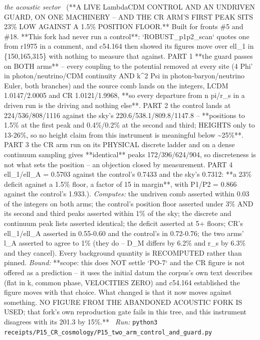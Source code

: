\begin{description}
\textit{the acoustic sector} \ (**A LIVE LambdaCDM CONTROL AND AN UNDRIVEN GUARD, ON ONE MACHINERY -- AND THE CR ARM'S FIRST PEAK SITS 23\% LOW AGAINST A 1.5\% POSITION FLOOR.** Built for fronts \#5 and \#18. **This fork had never run a control**: `ROBUST\_p1p2\_scan` quotes one from r1975 in a comment, and c54.164 then showed its figures move over ell\_1 in \{150,165,315\} with nothing to measure that against. PART 1 **the guard passes on BOTH arms** -- every coupling to the potential removed at every site (4 Phi' in photon/neutrino/CDM continuity AND k\textasciicircum{}2 Psi in photon-baryon/neutrino Euler, both branches) and the source comb lands on the integers, LCDM 1.0147/2.0005 and CR 1.0121/1.9968, **so every departure from n pi/r\_s in a driven run is the driving and nothing else**. PART 2 the control lands at 224/536/808/1116 against the sky's 220.6/538.1/809.8/1147.8 -- **positions to 1.5\% at the first peak and 0.4\%/0.2\% at the second and third; HEIGHTS only to 13-26\%, so no height claim from this instrument is meaningful below \textasciitilde{}25\%**. PART 3 the CR arm run on its PHYSICAL discrete ladder and on a dense continuum sampling gives **identical** peaks 172/396/624/904, so discreteness is not what sets the position -- an objection closed by measurement. PART 4 ell\_1/ell\_A = 0.5703 against the control's 0.7433 and the sky's 0.7312: **a 23\% deficit against a 1.5\% floor, a factor of 15 in margin**, with P1/P2 = 0.866 against the control's 1.933.). 
\emph{Computes:} the undriven comb asserted within 0.03 of the integers on both arms; the control's position floor asserted under 3\% AND its second and third peaks asserted within 1\% of the sky; the discrete and continuum peak lists asserted identical; the deficit asserted at 5+ floors; CR's ell\_1/ell\_A asserted in 0.55-0.60 and the control's in 0.72-0.76; the two arms' l\_A asserted to agree to 1\% (they do -- D\_M differs by 6.2\% and r\_s by 6.3\% and they cancel). Every background quantity is RECOMPUTED rather than pinned.
 \emph{Bound:} **scope: this does NOT settle `PO-7` and the CR figure is not offered as a prediction -- it uses the initial datum the corpus's own text describes (flat in k, common phase, VELOCITIES ZERO) and c54.164 established the figure moves with that choice. What changed is that it now moves against something. NO FIGURE FROM THE ABANDONED ACOUSTIC FORK IS USED; that fork's own reproduction gate fails in this tree, and this instrument disagrees with its 201.3 by 15\%.**
\ \emph{Run:} \texttt{python3 receipts/P15\_CR\_cosmology/P15\_two\_arm\_control\_and\_guard.py}

\end{description}
